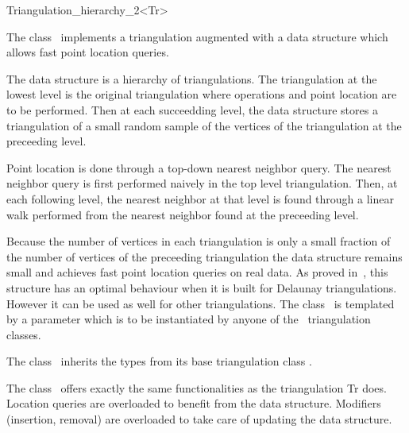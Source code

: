 

\begin{ccRefClass}{Triangulation_hierarchy_2<Tr>}

\ccDefinition
The class \ccRefName\ implements a triangulation augmented with
a data structure which allows fast point location queries.

The data structure is a hierarchy 
of triangulations. The triangulation at the lowest level is
the original triangulation where operations and point location are to 
be performed.
Then at each succeedding level, the data structure
stores a triangulation of a small random sample of the vertices
of the triangulation at the preceeding level. 

Point location
is done through a top-down nearest neighbor query.
The nearest neighbor query is first
performed naively in the top level triangulation.
Then, at each following level, the nearest neighbor at that level
is found through a linear walk performed from
the nearest neighbor found at the preceeding level.

Because the number of vertices in each triangulation is only a small
fraction of the number of vertices of the preceeding triangulation 
the data structure remains small and achieves fast point location 
queries on real
data. As proved in~\cite{d-iirdt-98}, this structure has an optimal behaviour
when it is built for Delaunay triangulations.
However it can be used as well for other triangulations.
The class \ccRefName\ is templated by a parameter
which is to be instantiated by anyone of the \cgal\ triangulation
classes.


\ccInheritsFrom
{}

\ccTypes
The class \ccRefName\ inherits the types from its base triangulation
class . 

The class \ccRefName\ offers exactly the same functionalities
as the triangulation Tr does.
Location queries are overloaded to benefit from the
data structure. Modifiers (insertion, removal) are overloaded
to take care of updating the data structure.


\end{ccRefClass}

